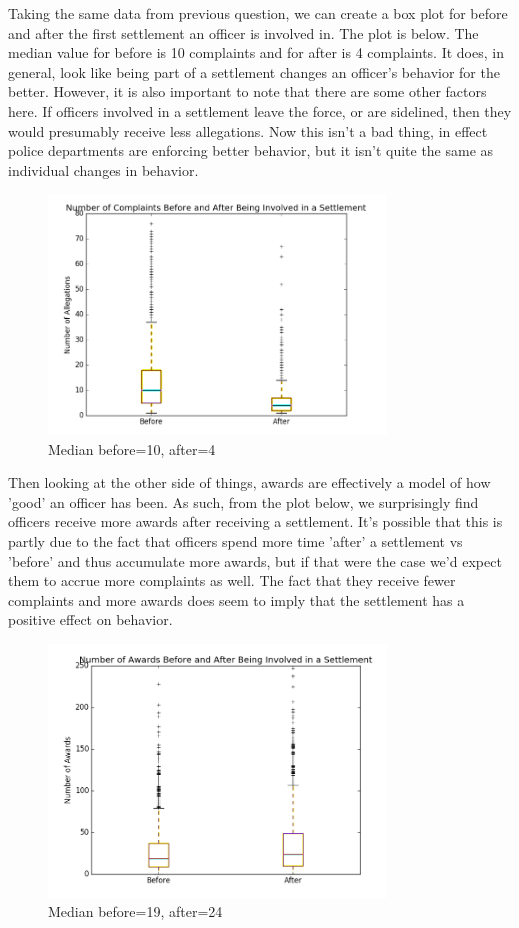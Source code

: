 \documentclass{article}
\begin{document}
Taking the same data from previous question, we can create a box plot for before and after the first settlement an officer is involved in. The plot is below. The median value for before is 10 complaints and for after is 4 complaints. It does, in general, look like being part of a settlement changes an officer's behavior for the better. However, it is also important to note that there are some other factors here. If officers involved in a settlement leave the force, or are sidelined, then they would presumably receive less allegations. Now this isn't a bad thing, in effect police departments are enforcing better behavior, but it isn't quite the same as individual changes in behavior.

\begin{figure}[h!]
\centering
\caption{Median before=10, after=4}
\includegraphics[width=0.8\textwidth]{settb.png}
\end{figure}

Then looking at the other side of things, awards are effectively a model of how 'good' an officer has been. As such, from the plot below, we surprisingly find officers receive more awards after receiving a settlement. It's possible that this is partly due to the fact that officers spend more time 'after' a settlement vs 'before' and thus accumulate more awards, but if that were the case we'd expect them to accrue more complaints as well. The fact that they receive fewer complaints and more awards does seem to imply that the settlement has a positive effect on behavior.

\begin{figure}[h!]
\centering
\caption{Median before=19, after=24}
\includegraphics[width=0.8\textwidth]{awards.png}
\end{figure}
\end{document}
